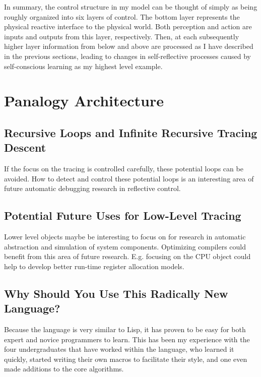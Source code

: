 In summary, the control structure in my model can be thought of simply
as being roughly organized into six layers of control.  The bottom
layer represents the physical reactive interface to the physical
world. Both perception and action are inputs and outputs from this
layer, respectively. Then, at each subsequently higher layer
information from below and above are processed as I have described in
the previous sections, leading to changes in self-reflective processes
caused by self-conscious learning as my highest level example.




\section{Panalogy Architecture}



\subsection{Recursive Loops and Infinite Recursive Tracing Descent}

If the focus on the tracing is controlled carefully, these potential
loops can be avoided.  How to detect and control these potential loops
is an interesting area of future automatic debugging research in
reflective control.

\subsection{Potential Future Uses for Low-Level Tracing}

Lower level objects maybe be interesting to focus on for research in
automatic abstraction and simulation of system components.  Optimizing
compilers could benefit from this area of future research.  E.g.
focusing on the CPU object could help to develop better run-time
register allocation models.

\subsection{Why Should You Use This Radically New Language?}

Because the language is very similar to Lisp, it has proven to be easy
for both expert and novice programmers to learn.  This has been my
experience with the four undergraduates that have worked within the
language, who learned it quickly, started writing their own macros to
facilitate their style, and one even made additions to the core
algorithms.

